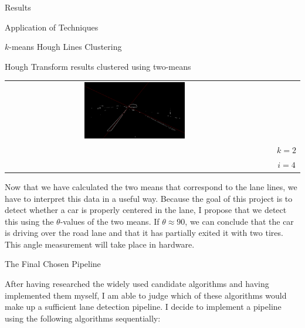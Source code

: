 \documentclass{matthijs}
\begin{document}
\begin{hoofdstuk}{Results}
\begin{paragraaf}{Application of Techniques}
\begin{subparagraaf}{$k$-means Hough Lines Clustering}
\begin{figuur}{Hough Transform results clustered using two-means}
\begin{tabular}{ccc}
						\includegraphics[width=0.4\textwidth]{0a0a0b1a-7c39d841.kmeans.out.png} \\

						&& $ k = 2 $ \\
						&& $ i = 4 $
					\end{tabular}

				\end{figuur}

				Now that we have calculated the two means that correspond to the lane lines, we have to interpret this data in a useful way.
				Because the goal of this project is to detect whether a car is properly centered in the lane, I propose that we detect this using the $\theta$-values of the two means.
				If $\theta \approx 90$, we can conclude that the car is driving over the road lane and that it has partially exited it with two tires.
				This angle measurement will take place in hardware.

			\end{subparagraaf}

		\end{paragraaf}

		\begin{paragraaf}{The Final Chosen Pipeline}

			After having researched the widely used candidate algorithms and having implemented them myself, I am able to judge which of these algorithms would make up a sufficient lane detection pipeline.
			I decide to implement a pipeline using the following algorithms sequentially:

			\begin{enumerate}


\end{enumerate}
\end{paragraaf}
\end{hoofdstuk}
\end{document}
